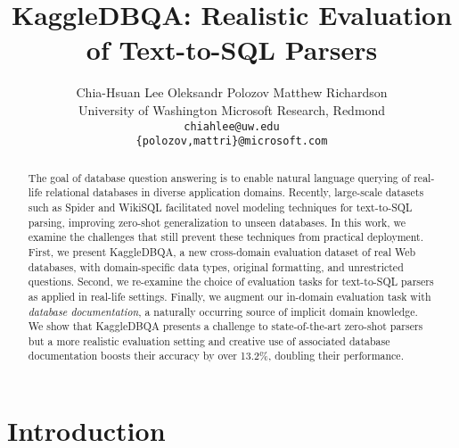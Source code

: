 \documentclass[11pt,a4paper]{article}
\title{{KaggleDBQA}: {R}ealistic {E}valuation of {T}ext-to-{SQL} {P}arsers}
\author{
Chia-Hsuan Lee\uw\aspace
Oleksandr Polozov\ms\aspace
Matthew Richardson\ms\aspace \\
\uw University of Washington \aspace\ms Microsoft Research, Redmond \\
{\tt chiahlee@uw.edu}\\
{\tt \{polozov,mattri\}@microsoft.com}
}
\newcommand{\systemname}{\mbox{KaggleDBQA}\xspace}
\begin{document}
\maketitle
\begin{abstract}
The goal of database question answering is to enable natural language querying of real-life relational databases in
diverse application domains.
Recently, large-scale datasets such as Spider and WikiSQL facilitated novel modeling techniques for text-to-SQL parsing,
improving zero-shot generalization to unseen databases.
In this work, we examine the challenges that still prevent these techniques from practical deployment.
First, we present \systemname, a new cross-domain evaluation dataset of real Web databases, with domain-specific data
types, original formatting, and unrestricted questions.
Second, we re-examine the choice of evaluation tasks for text-to-SQL parsers as applied in real-life settings.
Finally, we augment our in-domain evaluation task with \emph{database documentation}, a naturally occurring source of
implicit domain knowledge.
We show that \systemname presents a challenge to state-of-the-art zero-shot parsers but a more realistic evaluation
setting and creative use of associated database documentation boosts their accuracy by over 13.2\%, doubling their
performance.
\end{abstract}


\section{Introduction}
\label{sec:intro}
\end{document}
